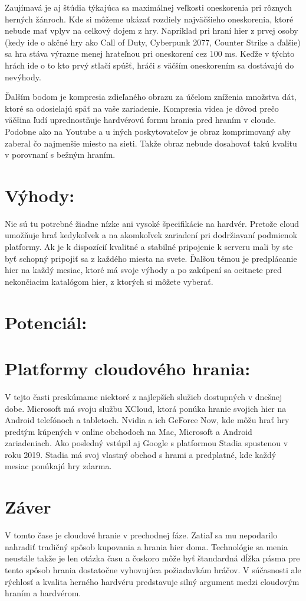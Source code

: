 \documentclass[10pt,twoside,slovak,a4paper]{article}
\begin{document}
Zaujímavá je aj štúdia týkajúca sa maximálnej veľkosti oneskorenia pri rôznych herných žánroch. Kde si môžeme ukázať rozdiely najväčšieho oneskorenia, ktoré nebude mať vplyv na celkový dojem z hry. Napríklad pri hraní hier z prvej osoby (kedy ide o akčné hry ako Call of Duty, Cyberpunk 2077, Counter Strike a ďalšie) sa hra stáva výrazne menej hrateľnou pri oneskorení cez 100 ms. Keďže v týchto hrách ide o to kto prvý stlačí spúšť, hráči s väčším oneskorením sa dostávajú do nevýhody.~\cite{5}

Ďalším bodom je kompresia zdieľaného obrazu za účelom zníženia množstva dát, ktoré sa odosielajú späť na vaše zariadenie. Kompresia videa je dôvod prečo väčšina ľudí uprednostňuje hardvérovú formu hrania pred hraním v cloude. Podobne ako na Youtube a u iných poskytovateľov je obraz komprimovaný aby zaberal čo najmenšie miesto na sieti. Takže obraz nebude dosahovať takú kvalitu v porovnaní s bežným hraním. 
\section{Výhody:} 
Nie sú tu potrebné žiadne nízke ani vysoké špecifikácie na hardvér. Pretože cloud umožňuje hrať kedykoľvek a na akomkoľvek zariadení pri dodržiavaní podmienok platformy. Ak je k dispozícií kvalitné a stabilné pripojenie k serveru mali by ste byť schopný pripojiť sa z každého miesta na svete. Ďalšou témou je predplácanie hier na každý mesiac, ktoré má svoje výhody a po zakúpení sa ocitnete pred nekončiacim katalógom hier, z ktorých si môžete vyberať.

\section{Potenciál:} 

\section{Platformy cloudového hrania:} 
V tejto časti preskúmame niektoré z najlepších služieb dostupných v dnešnej dobe. Microsoft má svoju službu XCloud, ktorá ponúka hranie svojich hier na Android telefónoch a tabletoch. Nvidia a ich GeForce Now, kde môžu hrať hry predtým kúpených v online obchodoch na Mac, Microsoft a Android zariadeniach. Ako posledný vstúpil aj Google s platformou Stadia spustenou v roku 2019. Stadia má svoj vlastný obchod s hrami a predplatné, kde každý mesiac ponúkajú hry zdarma. ~\cite{3} ~\cite{6}

\section{Záver} 
V tomto čase je cloudové hranie v prechodnej fáze. Zatiaľ sa mu nepodarilo nahradiť tradičný spôsob kupovania a hrania hier doma. Technológie sa menia neustále takže je len otázka času a čoskoro môže byť štandardná dĺžka pásma pre tento spôsob hrania dostatočne vyhovujúca požiadavkám hráčov. V súčasnosti ale rýchlosť a kvalita herného hardvéru predstavuje silný argument medzi cloudovým hraním a hardvérom.




\end{document}
